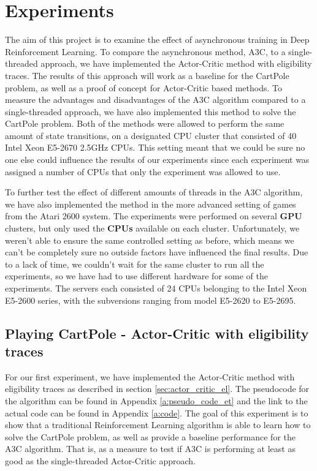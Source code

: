 \documentclass[11pt]{article}
\begin{document}

\section{Experiments}

The aim of this project is to examine the effect of asynchronous training
in Deep Reinforcement Learning.
To compare the asynchronous method, A3C, to a single-threaded approach,
we have implemented the Actor-Critic method with eligibility traces.
The results of this approach will work as a baseline for the
CartPole problem, as well as a proof of concept for Actor-Critic based
methods.
To measure the advantages and disadvantages of the A3C algorithm
compared to a single-threaded approach, we have also implemented this method
to solve the CartPole problem.
Both of the methods were allowed to perform the same amount of state transitions,
on a designated CPU cluster that consisted of 40 Intel Xeon E5-2670 2.5GHz CPUs.
This setting meant that we could be sure no one else could influence the results
of our experiments since each experiment was assigned a number of CPUs
that only the experiment was allowed to use.

To further test the effect of different amounts of threads in the A3C algorithm,
we have also implemented the method in the more advanced setting of
games from the Atari 2600 system.
The experiments were performed on several \textbf{GPU} clusters, but only used 
the \textbf{CPUs} available on each cluster.
Unfortunately, we weren't able to ensure the same controlled
setting as before, which means we can't be completely sure
no outside factors have influenced the final results.
Due to a lack of time, we couldn't wait for the same cluster to
run all the experiments, so we have had to use different hardware
for some of the experiments.
The servers each consisted of 24 CPUs belonging to the Intel Xeon
E5-2600 series, with the subversions ranging from model E5-2620 to
E5-2695.

\subsection{Playing CartPole - Actor-Critic with eligibility traces}

For our first experiment, we have implemented the Actor-Critic method
with eligibility traces as described in section \ref{sec:actor_critic_el}.
The pseudocode for the algorithm can be found in
Appendix \ref{a:pseudo_code_et} and the link to the actual
code can be found in Appendix \ref{a:code}.
The goal of this experiment is to show that a 
traditional Reinforcement Learning algorithm
is able to learn how to solve the CartPole problem, as well as provide a
baseline performance for the A3C algorithm.
That is, as a measure to test if A3C is performing at least as good
as the single-threaded Actor-Critic approach.
\end{document}
